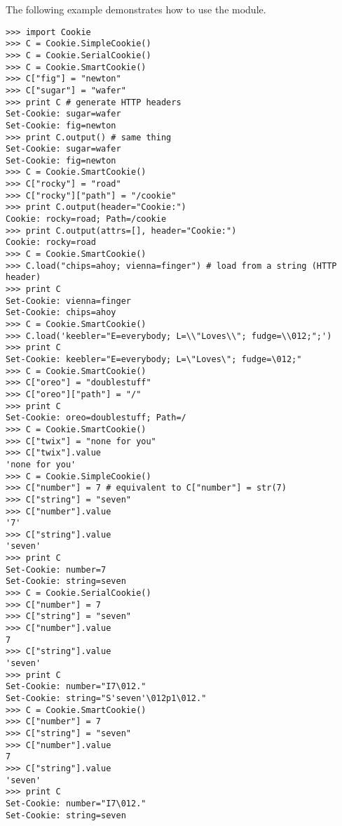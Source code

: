 The following example demonstrates how to use the  module.

\begin{verbatim}
>>> import Cookie
>>> C = Cookie.SimpleCookie()
>>> C = Cookie.SerialCookie()
>>> C = Cookie.SmartCookie()
>>> C["fig"] = "newton"
>>> C["sugar"] = "wafer"
>>> print C # generate HTTP headers
Set-Cookie: sugar=wafer
Set-Cookie: fig=newton
>>> print C.output() # same thing
Set-Cookie: sugar=wafer
Set-Cookie: fig=newton
>>> C = Cookie.SmartCookie()
>>> C["rocky"] = "road"
>>> C["rocky"]["path"] = "/cookie"
>>> print C.output(header="Cookie:")
Cookie: rocky=road; Path=/cookie
>>> print C.output(attrs=[], header="Cookie:")
Cookie: rocky=road
>>> C = Cookie.SmartCookie()
>>> C.load("chips=ahoy; vienna=finger") # load from a string (HTTP header)
>>> print C
Set-Cookie: vienna=finger
Set-Cookie: chips=ahoy
>>> C = Cookie.SmartCookie()
>>> C.load('keebler="E=everybody; L=\\"Loves\\"; fudge=\\012;";')
>>> print C
Set-Cookie: keebler="E=everybody; L=\"Loves\"; fudge=\012;"
>>> C = Cookie.SmartCookie()
>>> C["oreo"] = "doublestuff"
>>> C["oreo"]["path"] = "/"
>>> print C
Set-Cookie: oreo=doublestuff; Path=/
>>> C = Cookie.SmartCookie()
>>> C["twix"] = "none for you"
>>> C["twix"].value
'none for you'
>>> C = Cookie.SimpleCookie()
>>> C["number"] = 7 # equivalent to C["number"] = str(7)
>>> C["string"] = "seven"
>>> C["number"].value
'7'
>>> C["string"].value
'seven'
>>> print C
Set-Cookie: number=7
Set-Cookie: string=seven
>>> C = Cookie.SerialCookie()
>>> C["number"] = 7
>>> C["string"] = "seven"
>>> C["number"].value
7
>>> C["string"].value
'seven'
>>> print C
Set-Cookie: number="I7\012."
Set-Cookie: string="S'seven'\012p1\012."
>>> C = Cookie.SmartCookie()
>>> C["number"] = 7
>>> C["string"] = "seven"
>>> C["number"].value
7
>>> C["string"].value
'seven'
>>> print C
Set-Cookie: number="I7\012."
Set-Cookie: string=seven
\end{verbatim}
